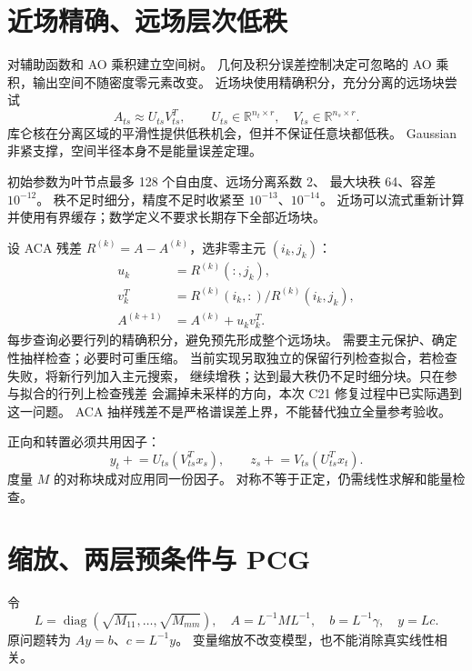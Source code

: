 \documentclass[UTF8,fontset=fandol,11pt,a4paper]{ctexart}
\numberwithin{equation}{section}
\newcommand{\diag}{\operatorname{diag}}
\begin{document}
\section{近场精确、远场层次低秩}
\label{sec:hierarchy}
对辅助函数和 AO 乘积建立空间树。
几何及积分误差控制决定可忽略的 AO 乘积，输出空间不随密度零元素改变。
近场块使用精确积分，充分分离的远场块尝试
\begin{equation}
A_{ts}\approx U_{ts}V_{ts}^T,\qquad
U_{ts}\in\mathbb R^{n_t\times r},\quad
V_{ts}\in\mathbb R^{n_s\times r}.
\end{equation}
库仑核在分离区域的平滑性提供低秩机会，但并不保证任意块都低秩。
Gaussian 非紧支撑，空间半径本身不是能量误差定理。

初始参数为叶节点最多 128 个自由度、远场分离系数 2、
最大块秩 64、容差 \(10^{-12}\)。
秩不足时细分，精度不足时收紧至 \(10^{-13}\)、\(10^{-14}\)。
近场可以流式重新计算并使用有界缓存；数学定义不要求长期存下全部近场块。

设 ACA 残差 \(R^{(k)}=A-A^{(k)}\)，选非零主元 \((i_k,j_k)\)：
\begin{align}
u_k&=R^{(k)}(:,j_k),\\
v_k^T&=R^{(k)}(i_k,:)/R^{(k)}(i_k,j_k),\\
A^{(k+1)}&=A^{(k)}+u_kv_k^T.
\end{align}
每步查询必要行列的精确积分，避免预先形成整个远场块。
需要主元保护、确定性抽样检查；必要时可重压缩。
当前实现另取独立的保留行列检查拟合，若检查失败，将新行列加入主元搜索，
继续增秩；达到最大秩仍不足时细分块。只在参与拟合的行列上检查残差
会漏掉未采样的方向，本次 C21 修复过程中已实际遇到这一问题。
ACA 抽样残差不是严格谱误差上界，不能替代独立全量参考验收。

正向和转置必须共用因子：
\begin{equation}
y_t\mathrel{+}=U_{ts}(V_{ts}^Tx_s),\qquad
z_s\mathrel{+}=V_{ts}(U_{ts}^Tx_t).
\label{eq:adjoint}
\end{equation}
度量 \(M\) 的对称块成对应用同一份因子。
对称不等于正定，仍需线性求解和能量检查。

\section{缩放、两层预条件与 PCG}
\label{sec:pcg}
令
\begin{equation}
L=\diag(\sqrt{M_{11}},\ldots,\sqrt{M_{mm}}),\quad
A=L^{-1}ML^{-1},\quad b=L^{-1}\gamma,\quad y=Lc.
\end{equation}
原问题转为 \(Ay=b\)、\(c=L^{-1}y\)。
变量缩放不改变模型，也不能消除真实线性相关。
\end{document}
